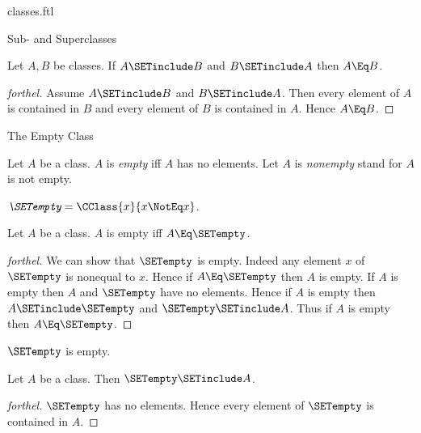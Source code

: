 \documentclass{stex}
\begin{document}
\begin{smodule}{classes.ftl}
\begin{sfragment}{Sub- and Superclasses}
  \begin{proposition}[forthel]
    Let $A, B$ be classes.
    If $A \SETinclude B$ and $B \SETinclude A$ then $A \Eq B$.
  \end{proposition}
  \begin{proof}[forthel]
    Assume $A \SETinclude B$ and $B \SETinclude A$.
    Then every element of $A$ is contained in $B$ and every element of $B$ is contained in $A$.
    Hence $A \Eq B$.
  \end{proof}
\end{sfragment}

\begin{sfragment}{The Empty Class}
  \begin{definition}[forthel]
    Let $A$ be a class.
    $A$ is \emph{empty} iff $A$ has no elements.
    Let $A$ is \emph{nonempty} stand for $A$ is not empty.
  \end{definition}

  \begin{definition}[forthel]
    $\emph{\SETempty} = \CClass{x}{x \NotEq x}$.
  \end{definition}

  \begin{proposition}[forthel]
    Let $A$ be a class.
    $A$ is empty iff $A \Eq \SETempty$.
  \end{proposition}
  \begin{proof}[forthel]
    We can show that $\SETempty$ is empty.
    Indeed any element $x$ of $\SETempty$ is nonequal to $x$.
    Hence if $A \Eq \SETempty$ then $A$ is empty.
    If $A$ is empty then $A$ and $\SETempty$ have no elements.
    Hence if $A$ is empty then $A \SETinclude \SETempty$ and $\SETempty \SETinclude A$.
    Thus if $A$ is empty then $A \Eq \SETempty$.
  \end{proof}

  \begin{corollary}[forthel]
    $\SETempty$ is empty.
  \end{corollary}

  \begin{corollary}[forthel]
    Let $A$ be a class.
    Then $\SETempty \SETinclude A$.
  \end{corollary}
  \begin{proof}[forthel]
    $\SETempty$ has no elements.
    Hence every element of $\SETempty$ is contained in $A$.
  \end{proof}
\end{sfragment}


\end{smodule}
\end{document}
